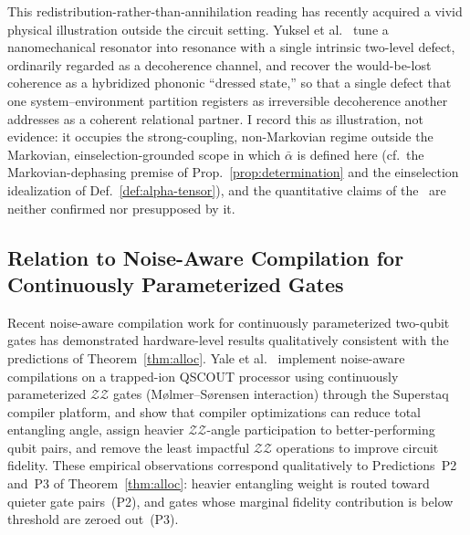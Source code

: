 This redistribution-rather-than-annihilation reading has recently
acquired a vivid physical illustration outside the circuit setting.
Yuksel et al.~\cite{Yuksel2026PhononicDressed} tune a nanomechanical
resonator into resonance with a single intrinsic two-level defect, ordinarily regarded as a decoherence channel, and recover
the would-be-lost coherence as a hybridized phononic ``dressed state,''
so that a single defect that one system--environment partition registers
as irreversible decoherence another addresses as a coherent relational
partner.
I record this as illustration, not evidence: it occupies the
strong-coupling, non-Markovian regime outside the Markovian,
einselection-grounded scope in which $\bar\alpha$ is defined here
(cf.\ the Markovian-dephasing premise of Prop.~\ref{prop:determination}
and the einselection idealization of Def.~\ref{def:alpha-tensor}), and
the quantitative claims of the \RCF~are neither confirmed nor
presupposed by it.

\subsection{Relation to Noise-Aware Compilation for Continuously Parameterized Gates}
\label{subsec:prior-compilation}

Recent noise-aware compilation work for continuously parameterized two-qubit gates
has demonstrated hardware-level results qualitatively consistent with the predictions
of Theorem~\ref{thm:alloc}.
Yale et al.~\cite{Yale2025NoiseAware} implement noise-aware compilations on a
trapped-ion QSCOUT processor using continuously parameterized $\mathcal{ZZ}$ gates
(M\o{}lmer--S\o{}rensen interaction) through the Superstaq compiler platform,
and show that compiler optimizations can reduce total entangling angle, assign
heavier $\mathcal{ZZ}$-angle participation to better-performing qubit pairs, and
remove the least impactful $\mathcal{ZZ}$ operations to improve circuit fidelity.
These empirical observations correspond qualitatively to Predictions~P2 and~P3
of Theorem~\ref{thm:alloc}: heavier entangling weight is routed toward quieter
gate pairs~(P2), and gates whose marginal fidelity contribution is below threshold
are zeroed out~(P3).

